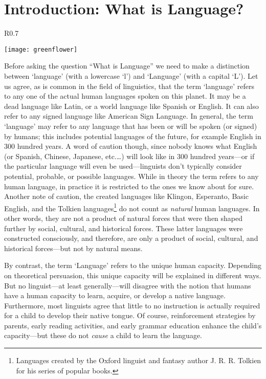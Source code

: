 \documentclass[11pt]{book}%
\theoremstyle{plain}
\numberwithin{equation}{section}
\theoremstyle{definition}
\newtheorem{phrase string}{Phrase String}
\begin{document}
\chapter[Introduction]{Introduction: What is Language?}
    \begin{wrapfigure}{R}{0.7\textwidth}
         \vspace{-1cm}
        \begin{center}
        \texttt{[image: greenflower]}
        \end{center}
         \vspace{-1cm}
    \end{wrapfigure}
Before asking the question ``What is Language'' we need to make a distinction between `language' (with a lowercase `l') and `Language' (with a capital `L'). Let us agree, as is common in the field of linguistics, that the term `language' refers to any one of the actual human languages spoken on this planet. It may be a dead language like Latin, or a world language like Spanish or English. It can also refer to any signed language like American Sign Language. In general, the term `language' may refer to any language that has been or will be spoken (or signed) by humans; this includes potential languages of the future, for example English in 300 hundred years. A word of caution though, since nobody knows what English (or Spanish, Chinese, Japanese, etc.\ldots) will look like in 300 hundred years---or if the particular language will even be used---linguists don't typically consider potential, probable, or possible languages. While in theory the term refers to any human language, in practice it is restricted to the ones we know about for sure. Another note of caution, the created languages like Klingon, Esperanto, Basic English, and the Tolkien languages\footnote{Languages created by the Oxford linguist and fantasy author J. R. R. Tolkien for his series of popular books.} do not count as \textsl{natural} human languages. In other words, they are not a product of natural forces that were then shaped further by social, cultural, and historical forces. These latter languages were constructed consciously, and therefore, are only a product of social, cultural, and historical forces---but not by natural means.

By contrast, the term `Language' refers to the unique human capacity. Depending on theoretical persuasion, this unique capacity will be explained in different ways. But no linguist---at least generally---will disagree with the notion that humans have a human capacity to learn, acquire, or develop a native language. Furthermore, most linguists agree that little to no instruction is actually required for a child to develop their native tongue. Of course, reinforcement strategies by parents, early reading activities, and early grammar education enhance the child's capacity---but these do not \textsl{cause} a child to learn the language. 
\end{document}
